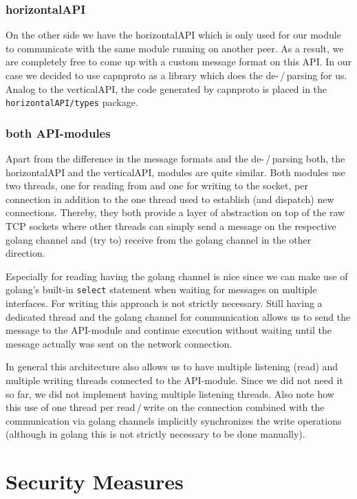 \documentclass[a4paper,english,10pt,NET]{tumarticle}
\begin{document}
\subsubsection{horizontalAPI}
On the other side we have the horizontalAPI which is only used for our module to communicate with the same module running on another peer.
As a result, we are completely free to come up with a custom message format on this API.
In our case we decided to use capnproto as a library which does the de-\,/\,parsing for us.
Analog to the verticalAPI, the code generated by capnproto is placed in the \texttt{horizontalAPI/types} package.

\subsubsection{both API-modules}
Apart from the difference in the message formats and the de-\,/\,parsing both, the horizontalAPI and the verticalAPI, modules are quite similar.
Both modules use two threads, one for reading from and one for writing to the socket, per connection in addition to the one thread used to establish (and dispatch) new connections.
Thereby, they both provide a layer of abstraction on top of the raw TCP sockets where other threads can simply send a message on the respective golang channel and (try to) receive from the golang channel in the other direction.

Especially for reading having the golang channel is nice since we can make use of golang's built-in \texttt{select} statement when waiting for messages on multiple interfaces.
For writing this approach is not strictly necessary.
Still having a dedicated thread and the golang channel for communication allows us to send the message to the API-module and continue execution without waiting until the message actually was sent on the network connection.

In general this architecture also allows us to have multiple listening (read) and multiple writing threads connected to the API-module.
Since we did not need it so far, we did not implement having multiple listening threads.
Also note how this use of one thread per read\,/\,write on the connection combined with the communication via golang channels implicitly synchronizes the write operations (although in golang this is not strictly necessary to be done manually).


\section{Security Measures}
\end{document}
